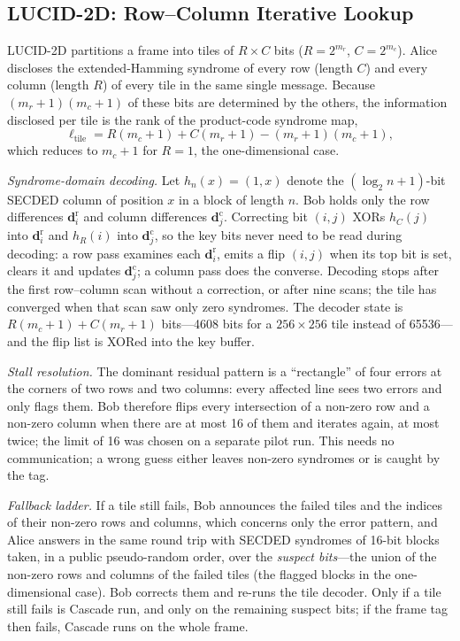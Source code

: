 \documentclass[conference]{IEEEtran}
\begin{document}
\subsection{LUCID-2D: Row--Column Iterative Lookup}
LUCID-2D partitions a frame into tiles of $R\times C$ bits ($R=2^{m_r}$, $C=2^{m_c}$). Alice discloses the extended-Hamming syndrome of every row (length $C$) and every column (length $R$) of every tile in the same single message. Because $(m_r+1)(m_c+1)$ of these bits are determined by the others, the information disclosed per tile is the rank of the product-code syndrome map,
\begin{equation}
\ell_{\mathrm{tile}}=R(m_c+1)+C(m_r+1)-(m_r+1)(m_c+1),
\label{eq:leak2d}
\end{equation}
which reduces to $m_c+1$ for $R=1$, the one-dimensional case.

\textit{Syndrome-domain decoding.} Let $h_n(x)=(1,x)$ denote the $(\log_2 n+1)$-bit SECDED column of position $x$ in a block of length $n$. Bob holds only the row differences $\mathbf{d}^{\mathrm{r}}_i$ and column differences $\mathbf{d}^{\mathrm{c}}_j$. Correcting bit $(i,j)$ XORs $h_C(j)$ into $\mathbf{d}^{\mathrm{r}}_i$ and $h_R(i)$ into $\mathbf{d}^{\mathrm{c}}_j$, so the key bits never need to be read during decoding: a row pass examines each $\mathbf{d}^{\mathrm{r}}_i$, emits a flip $(i,j)$ when its top bit is set, clears it and updates $\mathbf{d}^{\mathrm{c}}_j$; a column pass does the converse. Decoding stops after the first row--column scan without a correction, or after nine scans; the tile has converged when that scan saw only zero syndromes. The decoder state is $R(m_c+1)+C(m_r+1)$ bits---4608 bits for a $256\times256$ tile instead of 65536---and the flip list is XORed into the key buffer.

\textit{Stall resolution.} The dominant residual pattern is a ``rectangle'' of four errors at the corners of two rows and two columns: every affected line sees two errors and only flags them. Bob therefore flips every intersection of a non-zero row and a non-zero column when there are at most 16 of them and iterates again, at most twice; the limit of 16 was chosen on a separate pilot run. This needs no communication; a wrong guess either leaves non-zero syndromes or is caught by the tag.

\textit{Fallback ladder.} If a tile still fails, Bob announces the failed tiles and the indices of their non-zero rows and columns, which concerns only the error pattern, and Alice answers in the same round trip with SECDED syndromes of 16-bit blocks taken, in a public pseudo-random order, over the \emph{suspect bits}---the union of the non-zero rows and columns of the failed tiles (the flagged blocks in the one-dimensional case). Bob corrects them and re-runs the tile decoder. Only if a tile still fails is Cascade run, and only on the remaining suspect bits; if the frame tag then fails, Cascade runs on the whole frame.
\end{document}
